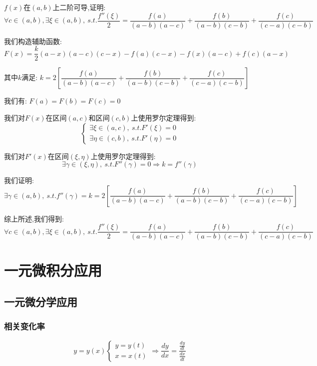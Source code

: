 
\begin{proposition}
	$f(x)$在$(a,b)$上二阶可导,证明: $$\forall c\in(a,b),\exists\xi\in(a,b),\ s.t. \dfrac{f''(\xi)}{2}=\dfrac{f(a)}{(a-b)(a-c)}+\dfrac{f(b)}{(a-b)(c-b)}+\dfrac{f(c)}{(c-a)(c-b)}$$
\end{proposition}
\begin{solution}

	我们构造辅助函数: $F(x)=\dfrac{k}{2}(a-x)(a-c)(c-x)-f(a)(c-x)-f(x)(a-c)+f(c)(a-x)$

	其中$k$满足: $k=2[\dfrac{f(a)}{(a-b)(a-c)}+\dfrac{f(b)}{(a-b)(c-b)}+\dfrac{f(c)}{(c-a)(c-b)}]$

	我们有: $F(a)=F(b)=F(c)=0$

	我们对$F(x)$在区间$(a,c)$和区间$(c,b)$上使用罗尔定理得到:
	$$\left\lbrace
		\begin{array}{l}
			\exists \xi\in(a,c),\ s.t. F'(\xi)=0 \\
			\exists \eta\in(c,b),\ s.t. F'(\eta)=0
		\end{array}
		\right. $$

	我们对$F'(x)$在区间$(\xi,\eta)$上使用罗尔定理得到:
	$$\exists\gamma\in(\xi,\eta),\ s.t. F''(\gamma)=0\Rightarrow k=f''(\gamma)$$

	我们证明: $\exists \gamma\in(a,b),\ s.t. f''(\gamma)=k=2[\dfrac{f(a)}{(a-b)(a-c)}+\dfrac{f(b)}{(a-b)(c-b)}+\dfrac{f(c)}{(c-a)(c-b)}]$

	综上所述,我们得到: $$\forall c\in(a,b),\exists\xi\in(a,b),\ s.t. \dfrac{f''(\xi)}{2}=\dfrac{f(a)}{(a-b)(a-c)}+\dfrac{f(b)}{(a-b)(c-b)}+\dfrac{f(c)}{(c-a)(c-b)}$$
\end{solution}

\chapter{一元微积分应用}
\section{一元微分学应用}
\subsection{相关变化率}
\begin{definition}
	$$y=y(x)
		\left\lbrace
		\begin{array}{l}
			y=y(t) \\
			x=x(t)
		\end{array}
		\right.
		\Rightarrow
		\frac{dy}{dx}=\frac{\frac{dy}{dt}}{\frac{dx}{dt}} $$
\end{definition}
